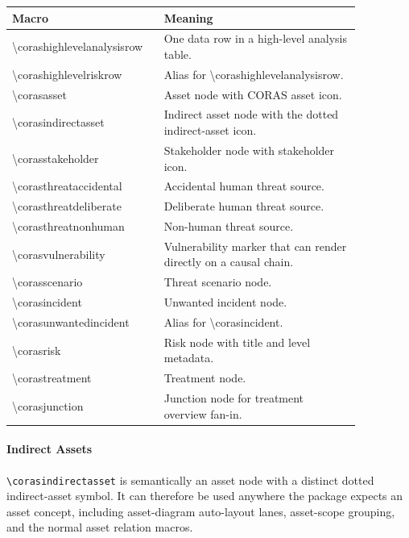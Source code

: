 \documentclass[a4paper]{article}
\begin{document}
\begin{center}
\begin{tabular}{>{\ttfamily}p{0.34\linewidth}p{0.52\linewidth}}
\hline
Macro & Meaning \\
\hline
\textbackslash corashighlevelanalysisrow & One data row in a high-level analysis table. \\
\textbackslash corashighlevelriskrow & Alias for \textbackslash corashighlevelanalysisrow. \\
\textbackslash corasasset & Asset node with CORAS asset icon. \\
\textbackslash corasindirectasset & Indirect asset node with the dotted indirect-asset icon. \\
\textbackslash corasstakeholder & Stakeholder node with stakeholder icon. \\
\textbackslash corasthreataccidental & Accidental human threat source. \\
\textbackslash corasthreatdeliberate & Deliberate human threat source. \\
\textbackslash corasthreatnonhuman & Non-human threat source. \\
\textbackslash corasvulnerability & Vulnerability marker that can render directly on a causal chain. \\
\textbackslash corasscenario & Threat scenario node. \\
\textbackslash corasincident & Unwanted incident node. \\
\textbackslash corasunwantedincident & Alias for \textbackslash corasincident. \\
\textbackslash corasrisk & Risk node with title and level metadata. \\
\textbackslash corastreatment & Treatment node. \\
\textbackslash corasjunction & Junction node for treatment overview fan-in. \\
\hline
\end{tabular}
\end{center}

\paragraph{Indirect Assets}

\texttt{\textbackslash corasindirectasset} is semantically an asset node with a
distinct dotted indirect-asset symbol. It can therefore be used anywhere the
package expects an asset concept, including asset-diagram auto-layout lanes,
asset-scope grouping, and the normal asset relation macros.
\end{document}
